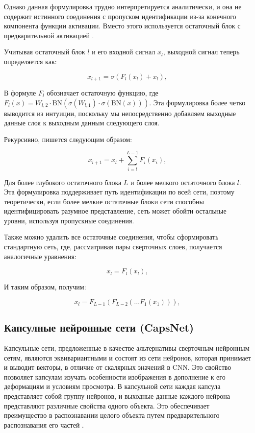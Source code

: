 Однако данная формулировка трудно интерпретируется аналитически, и она не содержит истинного соединения с пропуском идентификации из-за конечного компонента функции активации. Вместо этого используется остаточный блок с предварительной активацией \cite{he2016identity}. 

Учитывая остаточный блок \(l\) и его входной сигнал \(x_{l}\), выходной сигнал теперь определяется как:

\begin{equation}
    x_{l + 1} = \sigma(F_{l}(x_{l}) + x_{l})
, \end{equation}

В формуле \(F_{l}\) обозначает остаточную функцию, где \(F_{l}(x) = W_{l,2} \cdot \text{BN}(\sigma(W_{l,1}) \cdot \sigma(\text{BN}(x)))\). Эта формулировка более четко выводится из интуиции, поскольку мы непосредственно добавляем выходные данные слоя к выходным данным следующего слоя.

Рекурсивно, пишется следующим образом:

\begin{equation}
    x_{l + 1} = x_{l} + \sum_{i = l}^{L - 1} F_{i}(x_{i})
, \end{equation}

Для более глубокого остаточного блока \(L\) и более мелкого остаточного блока \(l\). Эта формулировка поддерживает путь идентификации по всей сети, поэтому теоретически, если более мелкие остаточные блоки сети способны идентифицировать разумное представление, сеть может обойти остальные уровни, используя пропускные соединения.

Также можно удалить все остаточные соединения, чтобы сформировать стандартную сеть, где, рассматривая пары сверточных слоев, получается аналогичные уравнения:

\begin{equation}
    x_{l} = F_{l}(x_{l})
, \end{equation}

И таким образом, получим:

\begin{equation}
    x_{l} = F_{L - 1}(F_{L - 2}(\ldots F_{1}(x_{1})))
, \end{equation}

\subsection{Капсулные нейронные сети (CapsNet)}

Капсульные сети, предложенные в качестве альтернативы сверточным нейронным сетям, являются эквивариантными и состоят из сети нейронов, которая принимает и выводит векторы, в отличие от скалярных значений в CNN. Это свойство позволяет капсулам изучать особенности изображения в дополнение к его деформациям и условиям просмотра. В капсульной сети каждая капсула представляет собой группу нейронов, и выходные данные каждого нейрона представляют различные свойства одного объекта. Это обеспечивает преимущество в распознавании целого объекта путем предварительного распознавания его частей \cite{lecun2015deep}.

